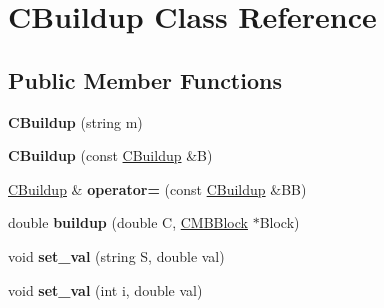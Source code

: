 \hypertarget{class_c_buildup}{}\section{C\+Buildup Class Reference}
\label{class_c_buildup}
\subsection*{Public Member Functions}
\begin{DoxyCompactItemize}
\item 
\mbox{\label{class_c_buildup_ac0a7cd5e49044a1c8ef70fbcee01b6ca}} 
{\bfseries C\+Buildup} (string m)
\item 
\mbox{\label{class_c_buildup_a2952da6770c99e6f9ec6f3f46a4a7aa0}} 
{\bfseries C\+Buildup} (const \hyperlink{class_c_buildup}{C\+Buildup} \&B)
\item 
\mbox{\label{class_c_buildup_a2ac7c04f317aec57ed13d0ea631ad64c}} 
\hyperlink{class_c_buildup}{C\+Buildup} \& {\bfseries operator=} (const \hyperlink{class_c_buildup}{C\+Buildup} \&BB)
\item 
\mbox{\label{class_c_buildup_ab855a570d2df55e2e51c9f2a13f86cd8}} 
double {\bfseries buildup} (double C, \hyperlink{class_c_m_b_block}{C\+M\+B\+Block} $\ast$Block)
\item 
\mbox{\label{class_c_buildup_afd3e95695f2df2500a16c09f8794071e}} 
void {\bfseries set\+\_\+val} (string S, double val)
\item 
\mbox{\label{class_c_buildup_a57219195100904dae4ecd1cad0144b44}} 
void {\bfseries set\+\_\+val} (int i, double val)
\end{DoxyCompactItemize}
